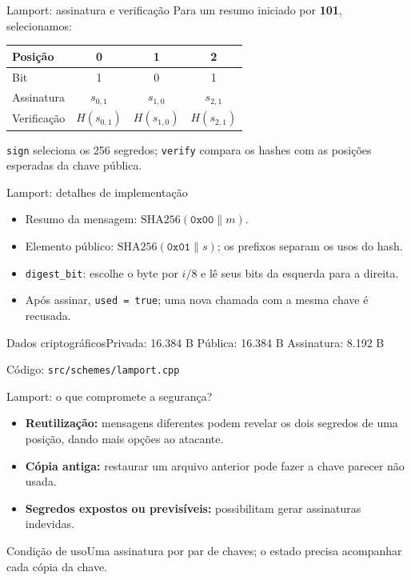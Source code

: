 \documentclass[aspectratio=169,11pt]{beamer}
\newcommand{\code}[1]{\texttt{#1}}
\newcommand{\src}[1]{\vfill{\scriptsize\color{muted} Código: \texttt{#1}}}
\begin{document}
\begin{frame}{Lamport: assinatura e verificação}
Para um resumo iniciado por \textbf{101}, selecionamos:
\begin{center}\renewcommand{\arraystretch}{1.3}
\begin{tabular}{lccc}\toprule
Posição & 0 & 1 & 2 \\\midrule
Bit & 1 & 0 & 1 \\
Assinatura & $s_{0,1}$ & $s_{1,0}$ & $s_{2,1}$ \\
Verificação & $H(s_{0,1})$ & $H(s_{1,0})$ & $H(s_{2,1})$ \\\bottomrule
\end{tabular}\end{center}
\code{sign} seleciona os 256 segredos; \code{verify} compara os hashes com as posições esperadas da chave pública.
\end{frame}

\begin{frame}{Lamport: detalhes de implementação}
\begin{itemize}
\item Resumo da mensagem: $\mathrm{SHA256}(\texttt{0x00}\mathbin{\|}m)$.
\item Elemento público: $\mathrm{SHA256}(\texttt{0x01}\mathbin{\|}s)$; os prefixos separam os usos do hash.
\item \code{digest\_bit}: escolhe o byte por $i/8$ e lê seus bits da esquerda para a direita.
\item Após assinar, \code{used = true}; uma nova chamada com a mesma chave é recusada.
\end{itemize}
\begin{block}{Dados criptográficos}Privada: 16.384 B \quad Pública: 16.384 B \quad Assinatura: 8.192 B\end{block}
\src{src/schemes/lamport.cpp}
\end{frame}

\begin{frame}{Lamport: o que compromete a segurança?}
\begin{itemize}
\item \textbf{Reutilização:} mensagens diferentes podem revelar os dois segredos de uma posição, dando mais opções ao atacante.
\item \textbf{Cópia antiga:} restaurar um arquivo anterior pode fazer a chave parecer não usada.
\item \textbf{Segredos expostos ou previsíveis:} possibilitam gerar assinaturas indevidas.
\end{itemize}
\vspace{0.25cm}
\begin{block}{Condição de uso}Uma assinatura por par de chaves; o estado precisa acompanhar cada cópia da chave.\end{block}
\end{frame}
\end{document}
